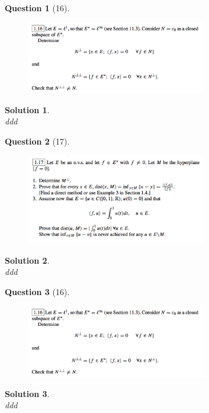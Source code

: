 \documentclass{article} %
\theoremstyle{quest}
\newtheorem*{question}{Question}
\newtheorem*{solution}{Solution}
\begin{document}
\newpage

\begin{question}[16]
\hfill
\begin{figure}[h!]
  \centering
    \includegraphics[width=0.7\textwidth]{funcA-1-16.png}
\end{figure}
\end{question}
\begin{solution} \hfill \\
ddd 
\end{solution}

\newpage

\begin{question}[17]
\hfill
\begin{figure}[h!]
  \centering
    \includegraphics[width=0.7\textwidth]{funcA-1-17.png}
\end{figure}
\end{question}
\begin{solution} \hfill \\
ddd 
\end{solution}

\newpage

\begin{question}[16]
\hfill
\begin{figure}[h!]
  \centering
    \includegraphics[width=0.7\textwidth]{funcA-1-16.png}
\end{figure}
\end{question}
\begin{solution} \hfill \\
ddd 
\end{solution}
\end{document}
